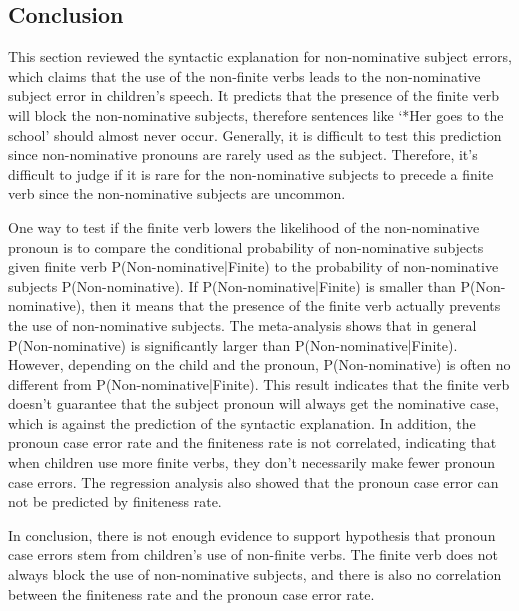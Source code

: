 \subsection{Conclusion}
This section reviewed the syntactic explanation for non-nominative subject errors, which claims that the use of the non-finite verbs leads to the non-nominative subject error in children's speech. It predicts that the presence of the finite verb will block the non-nominative subjects, therefore sentences like `*Her goes to the school' should almost never occur. Generally, it is difficult to test this prediction since non-nominative pronouns are rarely used as the subject. Therefore, it's difficult to judge if it is rare for the non-nominative subjects to precede a finite verb since the non-nominative subjects are uncommon. 

One way to test if the finite verb lowers the likelihood of the non-nominative pronoun is to compare the conditional probability of non-nominative subjects given finite verb P(Non-nominative|Finite) to the probability of non-nominative subjects P(Non-nominative). If P(Non-nominative|Finite) is smaller than P(Non-nominative), then it means that the presence of the finite verb actually prevents the use of non-nominative subjects. The meta-analysis shows that in general P(Non-nominative) is significantly larger than P(Non-nominative|Finite). However, depending on the child and the pronoun, P(Non-nominative) is often no different from P(Non-nominative|Finite). This result indicates that the finite verb doesn't guarantee that the subject pronoun will always get the nominative case, which is against the prediction of the syntactic explanation. In addition, the pronoun case error rate and the finiteness rate is not correlated, indicating that when children use more finite verbs, they don't necessarily make fewer pronoun case errors. The regression analysis also showed that the pronoun case error can not be predicted by finiteness rate. 

In conclusion, there is not enough evidence to support hypothesis that pronoun case errors stem from children's use of non-finite verbs. The finite verb does not always block the use of non-nominative subjects, and there is also no correlation between the finiteness rate and the pronoun case error rate. 